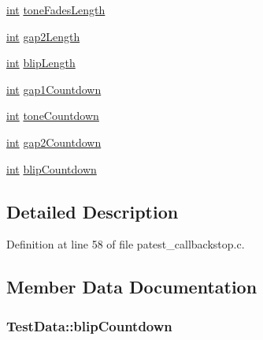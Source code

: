 \begin{DoxyCompactItemize}
\item 
\hyperlink{xmltok_8h_a5a0d4a5641ce434f1d23533f2b2e6653}{int} \hyperlink{struct_test_data_ab0aa5b3d001f36b318435307d3b5a752}{tone\+Fades\+Length}
\item 
\hyperlink{xmltok_8h_a5a0d4a5641ce434f1d23533f2b2e6653}{int} \hyperlink{struct_test_data_a68e2762980970d5a103cff73cadfa4b9}{gap2\+Length}
\item 
\hyperlink{xmltok_8h_a5a0d4a5641ce434f1d23533f2b2e6653}{int} \hyperlink{struct_test_data_a2984e6635b09b4c89d3f0fafe5bf89fc}{blip\+Length}
\item 
\hyperlink{xmltok_8h_a5a0d4a5641ce434f1d23533f2b2e6653}{int} \hyperlink{struct_test_data_aeb2df56618bc0f5f10e8d9ada3522bcb}{gap1\+Countdown}
\item 
\hyperlink{xmltok_8h_a5a0d4a5641ce434f1d23533f2b2e6653}{int} \hyperlink{struct_test_data_aa24ad5a16f1884112a4662932f0e01fc}{tone\+Countdown}
\item 
\hyperlink{xmltok_8h_a5a0d4a5641ce434f1d23533f2b2e6653}{int} \hyperlink{struct_test_data_a1941e96206c94d50930d43b9178acd84}{gap2\+Countdown}
\item 
\hyperlink{xmltok_8h_a5a0d4a5641ce434f1d23533f2b2e6653}{int} \hyperlink{struct_test_data_af6b75330e5105cafba532f06897b9b5b}{blip\+Countdown}
\end{DoxyCompactItemize}


\subsection{Detailed Description}


Definition at line 58 of file patest\+\_\+callbackstop.\+c.



\subsection{Member Data Documentation}
\subsubsection[{\texorpdfstring{blip\+Countdown}{blipCountdown}}]{ Test\+Data\+::blip\+Countdown}\hypertarget{struct_test_data_af6b75330e5105cafba532f06897b9b5b}{}\label{struct_test_data_af6b75330e5105cafba532f06897b9b5b}


